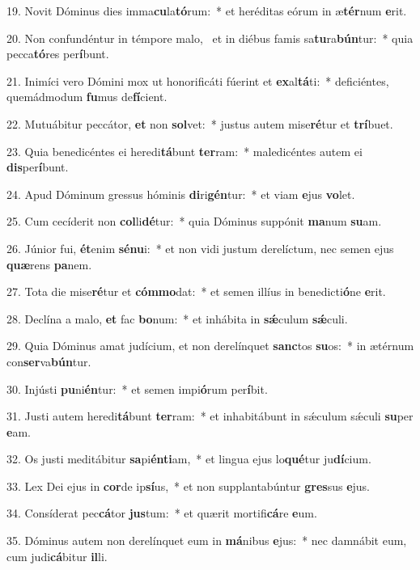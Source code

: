 19. Novit Dóminus dies imma\textbf{cu}la\textbf{tó}rum:~*  et heréditas eórum in æ\textbf{tér}num \textbf{e}rit.\

20. Non confundéntur in témpore malo, \dag\  et in diébus famis sa\textbf{tu}ra\textbf{bún}tur:~*  quia pecca\textbf{tó}res per\textbf{í}bunt.\

21. Inimíci vero Dómini mox ut honorificáti fúerint et \textbf{ex}al\textbf{tá}ti:~*  deficiéntes, quemádmodum \textbf{fu}mus de\textbf{fí}cient.\

22. Mutuábitur peccátor, \textbf{et} non \textbf{sol}vet:~*  justus autem mise\textbf{ré}tur et \textbf{trí}buet.\

23. Quia benedicéntes ei heredi\textbf{tá}bunt \textbf{ter}ram:~*  maledicéntes autem ei \textbf{dis}per\textbf{í}bunt.\

24. Apud Dóminum gressus hóminis \textbf{di}ri\textbf{gén}tur:~*  et viam \textbf{e}jus \textbf{vo}let.\

25. Cum cecíderit non \textbf{col}li\textbf{dé}tur:~*  quia Dóminus suppónit \textbf{ma}num \textbf{su}am.\

26. Júnior fui, \textbf{ét}enim \textbf{sé}\textbf{nu}i:~*  et non vidi justum derelíctum, nec semen ejus \textbf{quæ}rens \textbf{pa}nem.\

27. Tota die mise\textbf{ré}tur et \textbf{cóm}\textbf{mo}dat:~*  et semen illíus in benedicti\textbf{ó}ne \textbf{e}rit.\

28. Declína a malo, \textbf{et} fac \textbf{bo}num:~*  et inhábita in \textbf{sǽ}culum \textbf{sǽ}culi.\

29. Quia Dóminus amat judícium, et non derelínquet \textbf{sanc}tos \textbf{su}os:~*  in ætérnum con\textbf{ser}va\textbf{bún}tur.\

30. Injústi \textbf{pu}ni\textbf{én}tur:~*  et semen impi\textbf{ó}rum per\textbf{í}bit.\

31. Justi autem heredi\textbf{tá}bunt \textbf{ter}ram:~*  et inhabitábunt in sǽculum sǽculi \textbf{su}per \textbf{e}am.\

32. Os justi meditábitur \textbf{sa}pi\textbf{én}\textbf{ti}am,~*  et lingua ejus lo\textbf{qué}tur ju\textbf{dí}cium.\

33. Lex Dei ejus in \textbf{cor}de ip\textbf{sí}us,~*  et non supplantabúntur \textbf{gres}sus \textbf{e}jus.\

34. Consíderat pec\textbf{cá}tor \textbf{jus}tum:~*  et quærit mortifi\textbf{cá}re \textbf{e}um.\

35. Dóminus autem non derelínquet eum in \textbf{má}nibus \textbf{e}jus:~*  nec damnábit eum, cum judi\textbf{cá}bitur \textbf{il}li.\

